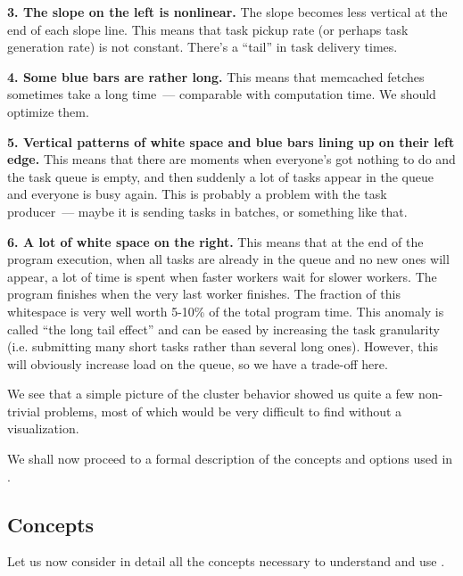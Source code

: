 \documentclass{article}
\begin{document}
\textbf{3. The slope on the left is nonlinear.} The slope becomes less vertical at the end of each slope line. This means that task pickup rate (or perhaps task generation rate) is not constant. There's a ``tail'' in task delivery times. 

\textbf{4. Some blue bars are rather long.} This means that memcached fetches sometimes take a long time~--- comparable with computation time. We should optimize them.

\textbf{5. Vertical patterns of white space and blue bars lining up on their left edge.} This means that there are moments when everyone's got nothing to do and the task queue is empty, and then suddenly a lot of tasks appear in the queue and everyone is busy again. This is probably a problem with the task producer~--- maybe it is sending tasks in batches, or something like that.

\textbf{6. A lot of white space on the right.} This means that at the end of the program execution, when all tasks are already in the queue and no new ones will appear, a lot of time is spent when faster workers wait for slower workers. The program finishes when the very last worker finishes. The fraction of this whitespace is very well worth 5-10\% of the total program time. This anomaly is called ``the long tail effect'' and can be eased by increasing the task granularity (i.e. submitting many short tasks rather than several long ones). However, this will obviously increase load on the queue, so we have a trade-off here.

\vspace{3mm}

We see that a simple picture of the cluster behavior showed us quite a few non-trivial problems, most of which would be very difficult to find without a visualization.

We shall now proceed to a formal description of the concepts and options used in \splot{}.

\pagebreak
\subsection{Concepts}

Let us now consider in detail all the concepts necessary to understand and use \splot{}.
\end{document}
